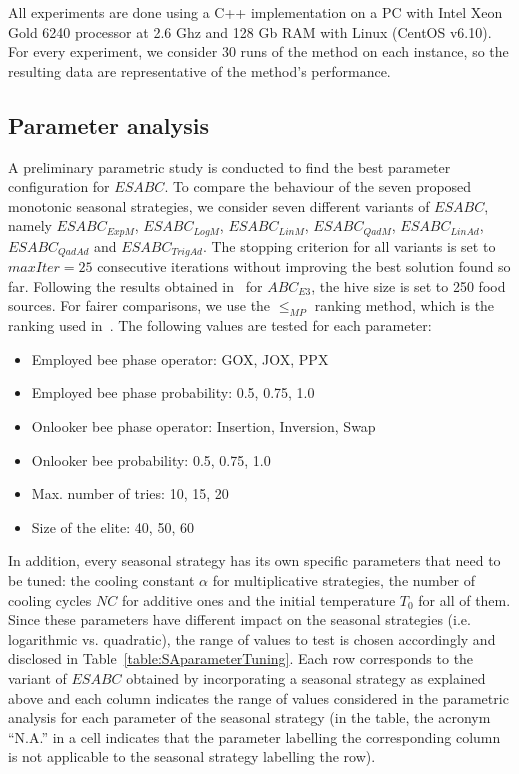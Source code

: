 \documentclass[icae]{iosart2x}
\newcommand{\reviewed}[1]{#1} %
\begin{document}
All experiments are done using a C++ implementation on a PC with \reviewed{Intel Xeon Gold 6240 processor at 2.6 Ghz and 128 Gb RAM with Linux (CentOS v6.10)}. For every experiment, we consider 30 runs of the method on each instance, so the resulting data are representative of the method's performance.

\subsection{Parameter analysis}\label{subsecParametric}
\reviewed{A preliminary parametric study is conducted to find the best parameter configuration for $ESABC$. To compare the behaviour of the seven proposed monotonic seasonal strategies, we consider seven different variants of $ESABC$, namely $ESABC_{ExpM}$, $ESABC_{LogM}$, $ESABC_{LinM}$, $ESABC_{QadM}$, $ESABC_{LinAd}$, $ESABC_{QadAd}$ and $ESABC_{TrigAd}$}. The stopping criterion for all variants is set to $\mathit{maxIter}=25$ consecutive iterations without improving the best solution found so far. Following the results obtained \reviewed{in~\cite{Diaz2022}} for $ABC_{E3}$, the hive size is set to 250 \reviewed{food sources}. For fairer comparisons, we use the $\leq_{MP}$ ranking method, which is the ranking used in~\cite{Diaz2022,Diaz2020genetic,Lei2011}. The following values are tested for each parameter:
\begin{itemize}
\item Employed bee phase operator: GOX, JOX, PPX
\item Employed bee phase probability: 0.5, 0.75, 1.0
\item Onlooker bee phase operator: Insertion, Inversion, Swap
\item Onlooker bee probability: 0.5, 0.75, 1.0
\item Max. number of tries: 10, 15, 20
\item Size of the elite: 40, 50, 60
\end{itemize}

In addition, every seasonal strategy has its own specific parameters that need to be tuned: the cooling constant $\alpha$ for multiplicative strategies, the number of cooling cycles $NC$ for additive ones and the initial temperature $T_0$ for all of them. Since these parameters have different impact on the seasonal strategies (i.e. logarithmic vs. quadratic), the range of values to test is chosen accordingly and disclosed in Table~\ref{table:SAparameterTuning}. \reviewed{Each row corresponds to the variant of $ESABC$ obtained by incorporating a seasonal strategy as explained above and each column indicates the range of values considered in the parametric analysis for each parameter of the seasonal strategy (in the table, the acronym ``N.A.'' in a cell indicates that the parameter labelling the corresponding column is not applicable to the seasonal strategy labelling the row).}
\end{document}
